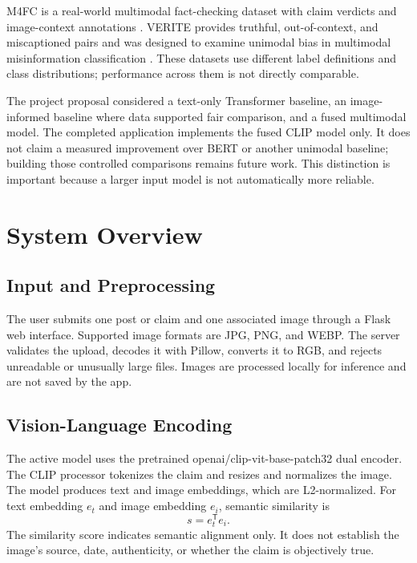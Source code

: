 \documentclass[conference]{IEEEtran}
\begin{document}
M4FC is a real-world multimodal fact-checking dataset with claim verdicts and image-context annotations \cite{m4fc}. VERITE provides truthful, out-of-context, and miscaptioned pairs and was designed to examine unimodal bias in multimodal misinformation classification \cite{verite}. These datasets use different label definitions and class distributions; performance across them is not directly comparable.

The project proposal considered a text-only Transformer baseline, an image-informed baseline where data supported fair comparison, and a fused multimodal model. The completed application implements the fused CLIP model only. It does not claim a measured improvement over BERT or another unimodal baseline; building those controlled comparisons remains future work. This distinction is important because a larger input model is not automatically more reliable.

\section{System Overview}
\subsection{Input and Preprocessing}
The user submits one post or claim and one associated image through a Flask web interface. Supported image formats are JPG, PNG, and WEBP. The server validates the upload, decodes it with Pillow, converts it to RGB, and rejects unreadable or unusually large files. Images are processed locally for inference and are not saved by the app.

\subsection{Vision-Language Encoding}
The active model uses the pretrained openai/clip-vit-base-patch32 dual encoder. The CLIP processor tokenizes the claim and resizes and normalizes the image. The model produces text and image embeddings, which are L2-normalized. For text embedding $e_t$ and image embedding $e_i$, semantic similarity is
\begin{equation}
s=e_t^{\mathsf{T}}e_i .
\end{equation}
The similarity score indicates semantic alignment only. It does not establish the image's source, date, authenticity, or whether the claim is objectively true.
\end{document}
